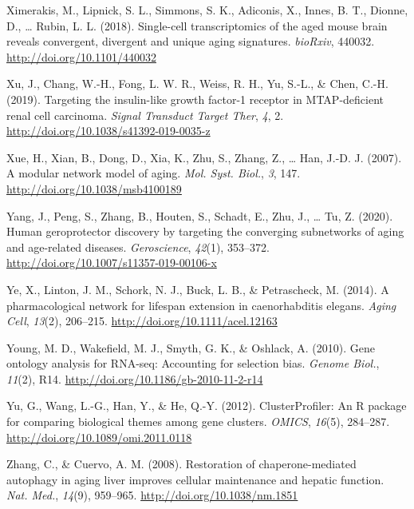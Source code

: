 \documentclass[12pt,twoside]{unicam}
\begin{document}
\begin{cslreferences}
\leavevmode\hypertarget{ref-Ximerakis2018}{}%
Ximerakis, M., Lipnick, S. L., Simmons, S. K., Adiconis, X., Innes, B. T., Dionne, D., \ldots{} Rubin, L. L. (2018). Single-cell transcriptomics of the aged mouse brain reveals convergent, divergent and unique aging signatures. \emph{bioRxiv}, 440032. \url{http://doi.org/10.1101/440032}

\leavevmode\hypertarget{ref-Xu2019}{}%
Xu, J., Chang, W.-H., Fong, L. W. R., Weiss, R. H., Yu, S.-L., \& Chen, C.-H. (2019). Targeting the insulin-like growth factor-1 receptor in MTAP-deficient renal cell carcinoma. \emph{Signal Transduct Target Ther}, \emph{4}, 2. \url{http://doi.org/10.1038/s41392-019-0035-z}

\leavevmode\hypertarget{ref-Xue2007}{}%
Xue, H., Xian, B., Dong, D., Xia, K., Zhu, S., Zhang, Z., \ldots{} Han, J.-D. J. (2007). A modular network model of aging. \emph{Mol. Syst. Biol.}, \emph{3}, 147. \url{http://doi.org/10.1038/msb4100189}

\leavevmode\hypertarget{ref-Yang2018}{}%
Yang, J., Peng, S., Zhang, B., Houten, S., Schadt, E., Zhu, J., \ldots{} Tu, Z. (2020). Human geroprotector discovery by targeting the converging subnetworks of aging and age-related diseases. \emph{Geroscience}, \emph{42}(1), 353--372. \url{http://doi.org/10.1007/s11357-019-00106-x}

\leavevmode\hypertarget{ref-Ye2014}{}%
Ye, X., Linton, J. M., Schork, N. J., Buck, L. B., \& Petrascheck, M. (2014). A pharmacological network for lifespan extension in caenorhabditis elegans. \emph{Aging Cell}, \emph{13}(2), 206--215. \url{http://doi.org/10.1111/acel.12163}

\leavevmode\hypertarget{ref-Young2010}{}%
Young, M. D., Wakefield, M. J., Smyth, G. K., \& Oshlack, A. (2010). Gene ontology analysis for RNA-seq: Accounting for selection bias. \emph{Genome Biol.}, \emph{11}(2), R14. \url{http://doi.org/10.1186/gb-2010-11-2-r14}

\leavevmode\hypertarget{ref-Yu2012}{}%
Yu, G., Wang, L.-G., Han, Y., \& He, Q.-Y. (2012). ClusterProfiler: An R package for comparing biological themes among gene clusters. \emph{OMICS}, \emph{16}(5), 284--287. \url{http://doi.org/10.1089/omi.2011.0118}

\leavevmode\hypertarget{ref-Zhang2008}{}%
Zhang, C., \& Cuervo, A. M. (2008). Restoration of chaperone-mediated autophagy in aging liver improves cellular maintenance and hepatic function. \emph{Nat. Med.}, \emph{14}(9), 959--965. \url{http://doi.org/10.1038/nm.1851}


\end{cslreferences}
\end{document}
